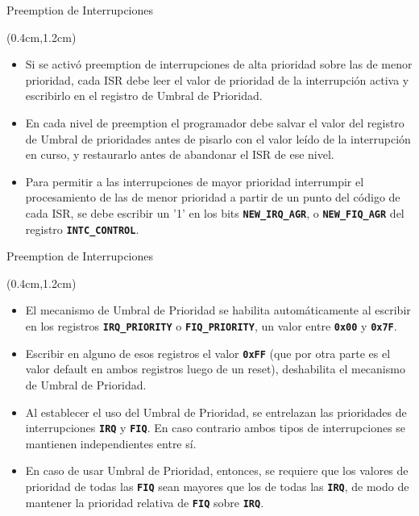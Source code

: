 \documentclass[usenames,table,xcolor={x11names},aspectratio=169]{beamer}
\begin{document}
\begin{frame}[t]{Preemption de Interrupciones}
 \begin{textblock*}{\textwidth}(0.4cm,1.2cm)
  \begin{itemize}[<+(1)->]\justifying \parskip 0.2cm
   \item Si se activó preemption de interrupciones de alta prioridad sobre las de menor prioridad, cada ISR debe leer el valor de prioridad de la interrupción activa y escribirlo en el registro de Umbral de Prioridad.
   \item En cada nivel de preemption el programador debe salvar el valor del registro de Umbral de prioridades antes de pisarlo con el valor leído de la interrupción en curso, y restaurarlo antes de abandonar el ISR de ese nivel.
   \item Para permitir a las interrupciones de mayor prioridad interrumpir el procesamiento de las de menor prioridad a partir de un punto del código de cada ISR, se debe escribir un '1' en los bits \texttt{\textbf{NEW\_IRQ\_AGR}}, o \texttt{\textbf{NEW\_FIQ\_AGR}} del registro \texttt{\textbf{INTC\_CONTROL}}.
  \end{itemize}
 \end{textblock*}
\end{frame}

\begin{frame}[t]{Preemption de Interrupciones}
 \begin{textblock*}{\textwidth}(0.4cm,1.2cm)
  \begin{itemize}[<+->]\justifying \parskip 0.2cm
   \item El mecanismo de Umbral de Prioridad se habilita automáticamente al escribir en los registros \texttt{\textbf{IRQ\_PRIORITY}} o \texttt{\textbf{FIQ\_PRIORITY}}, un valor entre \texttt{\textbf{0x00}} y \texttt{\textbf{0x7F}}.
   \item Escribir en alguno de esos registros el valor \texttt{\textbf{0xFF}} (que por otra parte es el valor default en ambos registros luego de un reset), deshabilita el mecanismo de Umbral de Prioridad.
   \item Al establecer el uso del Umbral de Prioridad, se entrelazan las prioridades de interrupciones \texttt{\textbf{IRQ}} y \texttt{\textbf{FIQ}}. En caso contrario ambos tipos de interrupciones se mantienen independientes entre sí.
   \item En caso de usar Umbral de Prioridad, entonces, se requiere que los valores de prioridad de todas las \texttt{\textbf{FIQ}} sean mayores que los de todas las \texttt{\textbf{IRQ}}, de modo de mantener la prioridad relativa de \texttt{\textbf{FIQ}} sobre \texttt{\textbf{IRQ}}.
  \end{itemize}
 \end{textblock*}
\end{frame}
\end{document}
